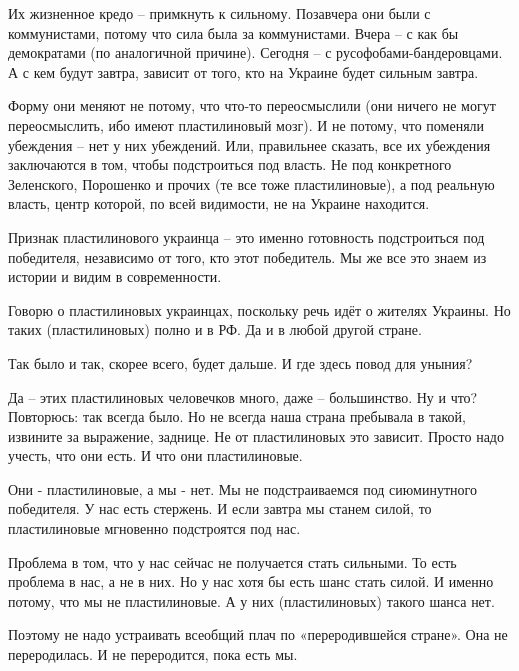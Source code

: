 Их жизненное кредо – примкнуть к сильному. Позавчера они были с коммунистами,
потому что сила была  за коммунистами. Вчера –  с как бы демократами (по
аналогичной причине). Сегодня –  с русофобами-бандеровцами. А с кем будут
завтра, зависит от того, кто на Украине будет сильным завтра.

Форму они меняют не потому, что что-то переосмыслили (они ничего не могут
переосмыслить, ибо имеют пластилиновый мозг). И не потому, что поменяли
убеждения – нет у них убеждений. Или, правильнее сказать, все их убеждения
заключаются в том, чтобы подстроиться под власть. Не под конкретного
Зеленского, Порошенко и прочих (те все тоже пластилиновые), а под реальную
власть, центр которой, по всей видимости, не на Украине находится.

Признак пластилинового украинца – это именно готовность подстроиться под
победителя, независимо от того, кто этот победитель. Мы же все это знаем из
истории и видим в современности. 

Говорю о пластилиновых украинцах, поскольку речь идёт о жителях Украины. Но
таких (пластилиновых) полно и в РФ. Да и в любой другой стране.

Так было и так, скорее всего, будет дальше. И где здесь повод для уныния?

Да – этих пластилиновых человечков много, даже – большинство. Ну и что?
Повторюсь: так всегда было. Но не всегда наша страна пребывала в такой,
извините за выражение, заднице. Не от пластилиновых это зависит. Просто надо
учесть, что они есть. И что они пластилиновые.

Они - пластилиновые, а мы - нет. Мы не подстраиваемся под сиюминутного
победителя. У нас есть стержень. И если завтра мы станем силой, то
пластилиновые мгновенно подстроятся под нас.

Проблема в том, что у нас сейчас не получается стать сильными. То есть проблема
в нас, а не в них. Но у нас хотя бы есть шанс стать силой. И именно потому, что
мы не пластилиновые. А у них (пластилиновых) такого шанса нет.

Поэтому не надо устраивать всеобщий плач по «переродившейся стране». Она не
переродилась. И не переродится, пока есть мы.

